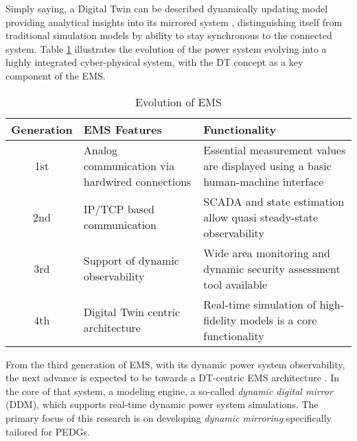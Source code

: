 
Simply saying, a Digital Twin can be described dynamically updating model providing analytical insights into its mirrored system , distinguishing itself from traditional simulation models by ability to stay synchronous to the connected system. Table \ref{tab:ems_evol} illustrates the evolution of the power system evolving into a highly integrated cyber-physical system, with the DT concept as a key component of the EMS.

\begin{table} [htbp]
    \centering
    \begin{threeparttable}%
        \caption{Evolution of EMS \autocite{8398846}}\label{tab:ems_evol}%
        \begin{tabular}{| c || p{5cm} | p{8cm} |}
            \hline
            \hline
                 \textbf{Generation} & \textbf{EMS Features} & \textbf{Functionality}\\ \hline
                1st & Analog communication via hardwired connections & Essential measurement values are displayed using a basic human-machine interface \\ \hline
                2nd & IP/TCP based  communication & SCADA and state estimation allow quasi steady-state observability \\ \hline
                3rd & Support of dynamic  observability & Wide area monitoring and dynamic security assessment tool available \\ \hline
                4th & Digital Twin centric architecture & Real-time simulation of high-fidelity models is a core functionality \\ \hline
            \hline
        \end{tabular}
    \end{threeparttable}
\end{table}

From the third generation of EMS, with its dynamic power system observability, the next advance is expected to be towards a DT-centric EMS architecture \autocite{dbt_mods_00054812}. In the core of that system, a modeling engine, a so-called \textit{dynamic digital mirror} (DDM), which supports real-time dynamic power system simulations. The primary focus of this research is on developing \textit{dynamic mirroring} specifically tailored for PEDGs.


